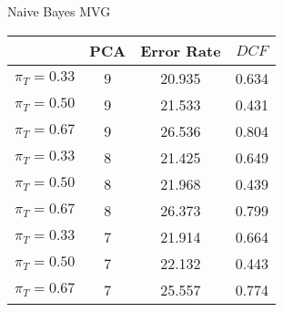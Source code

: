 \caption{Naive Bayes MVG}\label{tab:mvg_naiveacctable}
\begin{center}
\begin{tabular}{|c|c||c|c|}
\hline
\ & PCA & Error Rate & $DCF$\\
\hline
$\pi_T = 0.33$ & 9 & 20.935 & 0.634 \\
$\pi_T = 0.50$ & 9 & 21.533 & 0.431 \\
$\pi_T = 0.67$ & 9 & 26.536 & 0.804 \\
\hline
$\pi_T = 0.33$ & 8 & 21.425 & 0.649 \\
$\pi_T = 0.50$ & 8 & 21.968 & 0.439 \\
$\pi_T = 0.67$ & 8 & 26.373 & 0.799 \\
\hline
$\pi_T = 0.33$ & 7 & 21.914 & 0.664 \\
$\pi_T = 0.50$ & 7 & 22.132 & 0.443 \\
$\pi_T = 0.67$ & 7 & 25.557 & 0.774 \\
\hline
\end{tabular}
\end{center}
